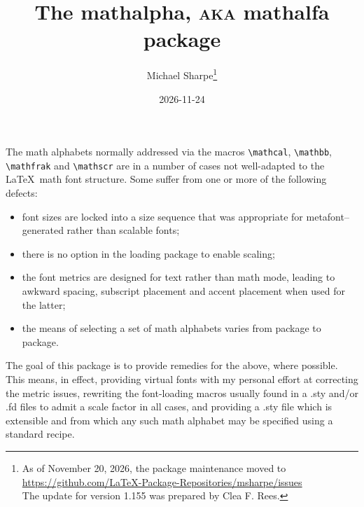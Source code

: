 \documentclass[11pt]{article}
\title{The \textsf{mathalpha,} \textsc{aka} \textsf{mathalfa} package}
\author{Michael Sharpe\thanks{As of November 20, 2026, the package
    maintenance moved to\\\url{https://github.com/LaTeX-Package-Repositories/msharpe/issues}\\
    The update for version 1.155 was prepared by Clea F. Rees.}}
\date{2026-11-24}  %
\begin{document}
\maketitle

The math alphabets normally addressed via the macros \verb|\mathcal|, \verb|\mathbb|, \verb|\mathfrak| and \verb|\mathscr| are in a number of cases not well-adapted to the \LaTeX\ math font structure. Some suffer from one or more of the following defects:
\begin{itemize}
\item
font sizes are locked into  a size sequence that was appropriate for \textsf{metafont}--generated rather than  scalable fonts;
\item there is no option in the loading package to enable scaling;
\item  the font metrics are designed for text rather than math mode, leading to awkward spacing, subscript placement and accent placement when used for the latter;
\item the means of selecting a set of math alphabets varies from package to package.
\end{itemize}
The goal of this package is to provide remedies for the above, where  possible. This means, in effect, providing virtual fonts with my personal effort at correcting the metric issues, rewriting the font-loading macros usually found in a \textsf{.sty} and/or \textsf{.fd} files to admit a scale factor in all cases, and providing a \textsf{.sty} file which is extensible and from which any such math alphabet may be specified using a standard recipe. 
\end{document}

